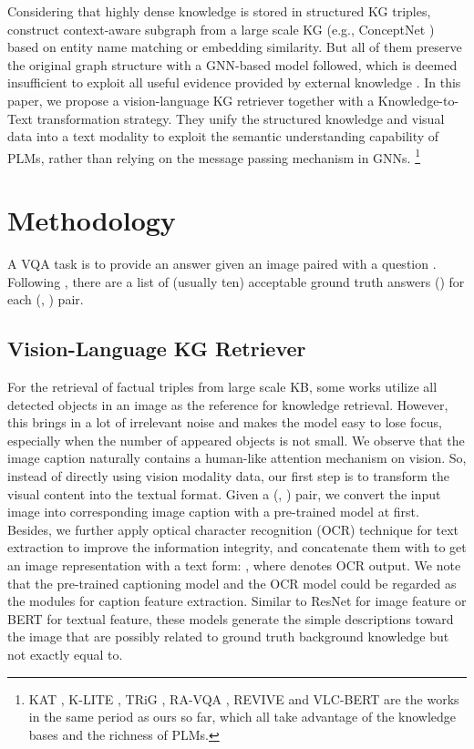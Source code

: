 \documentclass[sigconf]{acmart}
\begin{document}
Considering that highly dense knowledge is stored in structured KG triples,  
\citep{DBLP:journals/pami/WangWSDH18,DBLP:conf/nips/NarasimhanLS18,DBLP:conf/ijcai/ZhuYWS0W20} construct context-aware subgraph from a large scale KG (e.g., ConceptNet \cite{DBLP:conf/aaai/SpeerCH17}) 
based on entity name matching or embedding similarity.
But all of them preserve the original graph structure with a GNN-based model followed, which is deemed insufficient to exploit all useful evidence provided by external knowledge \citep{DBLP:conf/aaai/BianH0021}.
In this paper, we propose a vision-language KG retriever together with a Knowledge-to-Text transformation strategy. 
They unify the structured knowledge and visual data into a text modality to exploit the semantic understanding capability of PLMs, rather than relying on the message passing mechanism in GNNs. 
\footnote{KAT \citep{DBLP:conf/naacl/GuiWH0BG22}, K-LITE \citep{DBLP:journals/corr/abs-2204-09222}, TRiG \citep{DBLP:journals/corr/abs-2201-05299}, RA-VQA \citep{DBLP:journals/corr/abs-2210-03809}, REVIVE \citep{DBLP:journals/corr/abs-2206-01201}  and VLC-BERT \citep{DBLP:journals/corr/abs-2210-13626} are the works in the same period as ours so far, which all take advantage of the knowledge bases and the richness of PLMs.}

\section{Methodology}
A VQA task is to provide an answer  given an image  paired with a question .
 Following \citep{antol2015vqa},  there are a list of (usually ten) acceptable ground truth answers () for each (, ) pair.
\subsection{Vision-Language KG Retriever}
For the retrieval of factual triples from large scale KB, some works \citep{DBLP:conf/mm/Li0020,DBLP:conf/nips/NarasimhanLS18} utilize all detected objects in an image as the reference for knowledge retrieval. 
However, this brings in a lot of irrelevant noise and makes the model easy to lose focus, especially when the number of appeared objects is not small.
We observe that the image caption naturally contains a human-like attention mechanism on vision. 
So, instead of directly using vision modality data, our first step is to transform the visual content into the textual format.
Given a (, ) pair, we convert the input image  into corresponding image caption  with a pre-trained model at first. 
Besides, we further apply optical character recognition (OCR) technique \citep{DBLP:journals/corr/VeitMNMB16} for text extraction to improve the information integrity, and concatenate them with  to get an image representation  with a text form:
, where  denotes OCR output.
We note that  the pre-trained captioning model and the OCR model could be regarded as the modules for  caption feature extraction. Similar to ResNet \cite{DBLP:conf/cvpr/HeZRS16} for image feature or BERT \cite{DBLP:conf/naacl/DevlinCLT19} for textual feature, these models generate the simple descriptions toward the image  that are possibly related to ground truth background knowledge but not exactly equal to.
\end{document}
